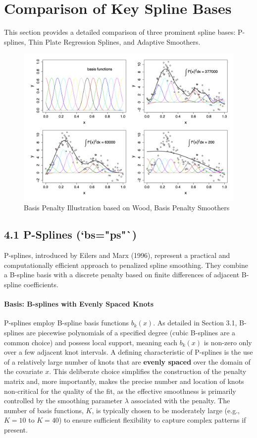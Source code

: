 \documentclass[11pt, a4paper]{article}
\begin{document}
\newpage
\section{Comparison of Key Spline Bases}
This section provides a detailed comparison of three prominent spline bases: P-splines, Thin Plate Regression Splines, and Adaptive Smoothers.

\begin{figure}[h!]
 \centering
 \includegraphics[width=\linewidth]{basis-penalty-illustration.png}
 \caption{Basis Penalty Illustration based on Wood, Basis Penalty Smoothers}
 \label{fig:enter-label-6}
\end{figure}
\subsection{4.1 P-Splines (`bs="ps"`)}
P-splines, introduced by Eilers and Marx (1996), represent a practical and computationally efficient approach to penalized spline smoothing. They combine a B-spline basis with a discrete penalty based on finite differences of adjacent B-spline coefficients.

\paragraph{Basis: B-splines with Evenly Spaced Knots}
P-splines employ B-spline basis functions $b_k(x)$. As detailed in Section 3.1, B-splines are piecewise polynomials of a specified degree (cubic B-splines are a common choice) and possess local support, meaning each $b_k(x)$ is non-zero only over a few adjacent knot intervals.
A defining characteristic of P-splines is the use of a relatively large number of knots that are \textbf{evenly spaced} over the domain of the covariate $x$. This deliberate choice simplifies the construction of the penalty matrix and, more importantly, makes the precise number and location of knots non-critical for the quality of the fit, as the effective smoothness is primarily controlled by the smoothing parameter $\lambda$ associated with the penalty. The number of basis functions, $K$, is typically chosen to be moderately large (e.g., $K=10$ to $K=40$) to ensure sufficient flexibility to capture complex patterns if present. 
\end{document}
